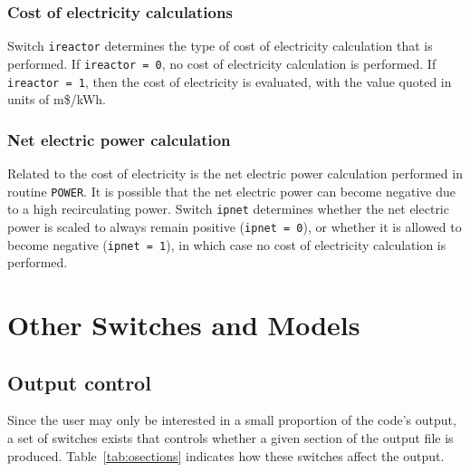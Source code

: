 \documentclass[11pt,a4paper]{report}
\begin{document}
\subsubsection{Cost of electricity calculations}

Switch \texttt{ireactor} determines the type of cost of electricity
calculation that is performed. If \texttt{ireactor = 0}, no cost of
electricity calculation is performed. If \texttt{ireactor = 1}, then the cost
of electricity is evaluated, with the value quoted in units of m\$/kWh.

\subsubsection{Net electric power calculation}

Related to the cost of electricity is the net electric power calculation
performed in routine \texttt{POWER}. It is possible that the net electric
power can become negative due to a high recirculating power. Switch
\texttt{ipnet} determines whether the net electric power is scaled to always
remain positive (\texttt{ipnet = 0}), or whether it is allowed to become
negative (\texttt{ipnet = 1}), in which case no cost of electricity
calculation is performed.

\section{Other Switches and Models}

\subsection{Output control}

Since the user may only be interested in a small proportion of the code's
output, a set of switches exists that controls whether a given section of the
output file is produced.  Table~\ref{tab:osections} indicates how these
switches affect the output.

\end{document}
